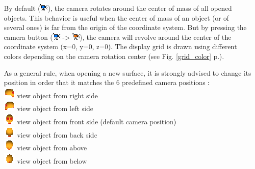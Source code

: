 \documentclass[12pt, a4paper]{book}
\begin{document}
By default (\includegraphics[scale=0.7]{../images/06/camera/move_cam2.png}), the camera rotates around the center of mass of all opened objects. This behavior is useful when the center of mass of an object (or of several ones) is far from the origin of the coordinate system. But by pressing the camera button (\includegraphics[scale=0.7]{../images/06/camera/move_cam2.png} -> \includegraphics[scale=0.7]{../images/06/camera/move_cam.png}), the camera will revolve around the center of the coordinate system (x=0, y=0, z=0).  The display grid is drawn using different colors depending on the camera rotation center (see Fig. \ref{grid_color} p.\pageref{grid_color}).



 As a general rule, when opening a new surface, it is strongly advised to change its position in order that it matches the 6 predefined camera positions :\\
\includegraphics[scale=0.7]{../images/06/camera/camera_right.png} view object from right side \\
\includegraphics[scale=0.7]{../images/06/camera/camera_left.png} view object from left side\\
\includegraphics[scale=0.7]{../images/06/camera/camera_front.png} view object from front side (default camera position)\\
\includegraphics[scale=0.7]{../images/06/camera/camera_back.png} view object from back side\\
\includegraphics[scale=0.7]{../images/06/camera/camera_above.png} view object from above\\
\includegraphics[scale=0.7]{../images/06/camera/camera_below.png} view object from below\\
\end{document}
